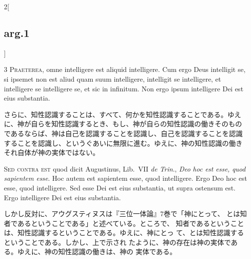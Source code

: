 \documentclass[paper=a4paper,fontsize=10pt,jafontsize=9pt,titlepage]{jlreq}
\begin{document}
\begin{paracol}{2}[\subsection{arg.1}]

{\scshape 3 Praeterea}, omne intelligere est aliquid intelligere. Cum
ergo Deus intelligit se, si ipsemet non est aliud quam suum
intelligere, intelligit se intelligere, et intelligere se intelligere
se, et sic in infinitum. Non ergo ipsum intelligere Dei est eius
substantia.

\switchcolumn

さらに、知性認識することは、すべて、何かを知性認識することである。ゆえ
に、神が自らを知性認識するとき、もし、神が自らの知性認識の働きそのもの
であるならば、神は自己を認識することを認識し、自己を認識することを認識
することを認識し、というぐあいに無限に進む。ゆえに、神の知性認識の働き
それ自体が神の実体ではない。

\switchcolumn*[\subsection{s.c.}]

{\scshape Sed contra est} quod dicit Augustinus, Lib.~VII {\itshape de
Trin}., {\itshape Deo hoc est esse, quod sapientem esse}. Hoc autem
est sapientem esse, quod intelligere. Ergo Deo hoc est esse, quod
intelligere. Sed esse Dei est eius substantia, ut supra ostensum
est. Ergo intelligere Dei est eius substantia.

\switchcolumn

しかし反対に、アウグスティヌスは『三位一体論』7巻で「神にとって、
とは知者であるということである」と述べている。ところで、
知者であるということは、知性認識するということである。ゆえに、神にとっ
て、とは知性認識するということである。しかし、上で示され
たように、神の存在は神の実体である。ゆえに、神の知性認識の働きは、神の
実体である。



\end{paracol}
\end{document}
